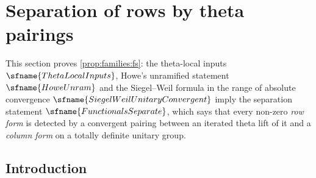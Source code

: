 \section{Separation of rows by theta pairings}\label{sec:pf:fs}

\providecommand{\fsT}{\mathcal T}
\providecommand{\fsX}{\mathbb X}
\providecommand{\fsA}{\mathcal A}
\providecommand{\fsE}{\mathcal E}
\providecommand{\fsF}{\mathfrak F}
\providecommand{\fsB}{\mathcal B}
\providecommand{\fsP}[1]{\mathsf{#1}}
\providecommand{\fsc}{\mathrm{c}}
\providecommand{\fst}{\mathrm{t}}
\providecommand{\fsper}{\mathrm{per}}
\providecommand{\fsKF}{\mathrm{KF}}
\providecommand{\fsCols}{\mathrm{Cols}}
\providecommand{\fsReach}{\mathrm{Reach}}
\providecommand{\fsdn}{\mathrm{dn}}
\providecommand{\fslift}{\mathrm{lift}}
\providecommand{\fsRows}{\mathrm{Rows}}
\providecommand{\fsCore}{\mathrm{Core}}
\providecommand{\fsHi}{H^{\infty}}
\providecommand{\fsm}{\mathfrak m}

This section proves \cref{prop:families:fs}: the theta-local inputs $\sfname{ThetaLocalInputs}$, Howe's unramified
statement $\sfname{HoweUnram}$ and the Siegel--Weil formula in the range of absolute convergence
$\sfname{SiegelWeilUnitaryConvergent}$ imply the separation statement $\sfname{FunctionalsSeparate}$, which says that
every non-zero \emph{row form} is detected by a convergent pairing between an iterated theta lift of it and a
\emph{column form} on a totally definite unitary group.

\subsection{Introduction}\label{sec:pf:fs:intro}

